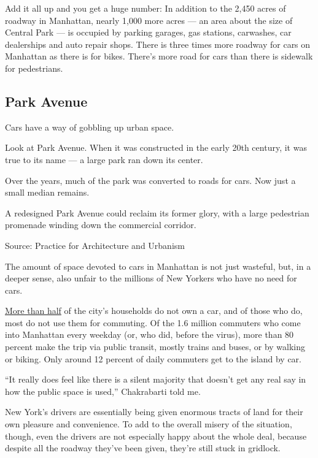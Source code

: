 Add it all up and you get a huge number: In addition to the 2,450 acres
of roadway in Manhattan, nearly 1,000 more acres --- an area about the
size of Central Park --- is occupied by parking garages, gas stations,
carwashes, car dealerships and auto repair shops. There is three times
more roadway for cars on Manhattan as there is for bikes. There's more
road for cars than there is sidewalk for pedestrians.

\hypertarget{park-avenue}{%
\subsection{Park Avenue}\label{park-avenue}}

Cars have a way of gobbling up urban space.

Look at Park Avenue. When it was constructed in the early 20th century,
it was true to its name --- a large park ran down its center.

Over the years, much of the park was converted to roads for cars. Now
just a small median remains.

A redesigned Park Avenue could reclaim its former glory, with a large
pedestrian promenade winding down the commercial corridor.

Source: Practice for Architecture and Urbanism

The amount of space devoted to cars in Manhattan is not just wasteful,
but, in a deeper sense, also unfair to the millions of New Yorkers who
have no need for cars.

\href{http://blog.tstc.org/2017/04/21/car-free-new-york-city/}{More than
half} of the city's households do not own a car, and of those who do,
most do not use them for commuting. Of the 1.6 million commuters who
come into Manhattan every weekday (or, who did, before the virus), more
than 80 percent make the trip via public transit, mostly trains and
buses, or by walking or biking. Only around 12 percent of daily
commuters get to the island by car.

``It really does feel like there is a silent majority that doesn't get
any real say in how the public space is used,'' Chakrabarti told me.

New York's drivers are essentially being given enormous tracts of land
for their own pleasure and convenience. To add to the overall misery of
the situation, though, even the drivers are not especially happy about
the whole deal, because despite all the roadway they've been given,
they're still stuck in gridlock.


